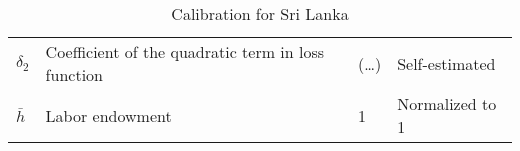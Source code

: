 \begin{table}[h]
\begin{tabular}{@{}llll@{}}
    $\delta_2$ & Coefficient of the quadratic term in loss function                &  (\dots)   &               Self-estimated                                                                 \\
    $\bar{h}$  & Labor endowment                                                   & 1      & Normalized to 1\\
    \bottomrule
    \end{tabular}%
    \caption{Calibration for Sri Lanka}
    \label{tab:cal-sri-lanka}
    \end{table}